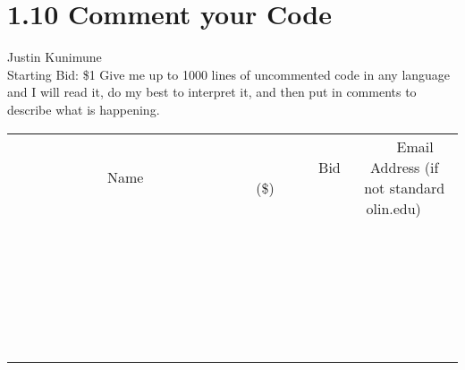 \documentclass[11pt]{article}
\begin{document}
\section*{1.10 Comment your Code}
Justin Kunimune
\\
Starting Bid: \$1
\newline
Give me up to 1000 lines of uncommented code in any language and I will read it, do my best to interpret it, and then put in comments to describe what is happening.
\\[6ex]
\begin{tabular}{c c c}
~~~~~~~~~~~~~Name~~~~~~~~~~~~~ & ~~~~~~~~~Bid (\$)~~~~~~~~~  & ~~~Email Address (if not standard olin.edu)~~~\\
 & & \\
\hline
 & & \\
\hline
 & & \\
\hline
 & & \\
\hline
 & & \\
\hline
 & & \\
\hline
 & & \\
\hline
 & & \\
\hline
 & & \\
\hline
 & & \\
\hline
 & & \\
\hline
 & & \\
\hline
 & & \\
\hline
 & & \\
\hline
 & & \\
\hline
 & & \\
\hline
 & & \\
\hline
 & & \\
\hline
 & & \\
\hline
 & & \\
\hline
 & & \\
\hline
 & & \\
\hline
 & & \\
\hline
 & & \\
\hline
 & & \\
\hline
 & & \\
\hline
\end{tabular}
\newpage
\end{document}
